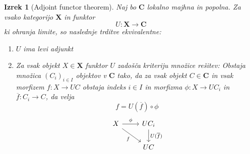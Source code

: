 \documentclass[12pt,a4paper]{book}
\theoremstyle{definition}
\theoremstyle{plain}
\newtheorem{izrek}[definicija]{Izrek}
\theoremstyle{definition}
\theoremstyle{remark}
\newcommand{\cat}[1]{\textbf{#1}}
\begin{document}
\begin{izrek} [Adjoint functor theorem]
Naj bo $\cat{C}$ lokalno majhna in popolna. Za vsako kategorijo $\cat{X}$ in funktor 
$$U : \cat{X} \to \cat{C}$$
ki ohranja limite, so naslednje trditve ekvivalentne:
\begin{enumerate}
\item $U$ ima levi adjunkt
\item Za vsak objekt $X \in \cat{X}$ funktor $U$ zadošča kriteriju množice rešitev:
Obstaja množica $(C_i)_{i \in I}$ objektov v $\cat{C}$ tako, da za vsak objekt $C \in \cat{C}$ in vsak morfizem $f : X \to UC$ obstaja indeks $i \in I$ in morfizma $\phi : X \to UC_i$ in $\overline{f} : C_i \to C$, da velja
$$f = U(\overline{f}) \circ \phi$$
\[ \begin{tikzcd}
X \arrow[r, "\phi"] \arrow[rd, "f"'] & UC_i \arrow[d, "U(\overline{f})"] \\
& UC
\end{tikzcd} \]
\end{enumerate}
\end{izrek}
\end{document}
